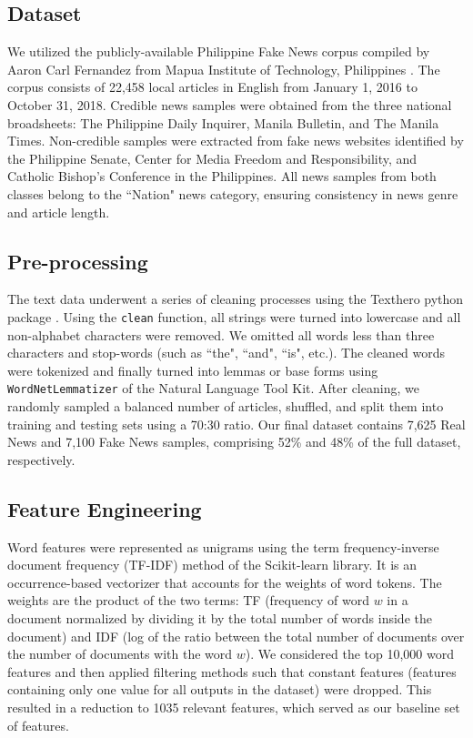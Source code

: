 \documentclass[10pt,a4paper,twoside]{article}
\begin{document}
\subsection{Dataset} 
We utilized the publicly-available Philippine Fake News corpus compiled by Aaron Carl Fernandez from Mapua Institute of Technology, Philippines \cite{Fernandez}. The corpus consists of 22,458 local articles in English from January 1, 2016 to October 31, 2018. Credible news samples were obtained from the three national broadsheets: The Philippine Daily Inquirer, Manila Bulletin, and The Manila Times. Non-credible samples were extracted from fake news websites identified by the Philippine Senate, Center for Media Freedom and Responsibility, and Catholic Bishop's Conference in the Philippines. All news samples from both classes belong to the ``Nation" news category, ensuring consistency in news genre and article length.
\vspace{-1.7em}
\subsection{Pre-processing} 
The text data underwent a series of cleaning processes using the Texthero python package \cite{Besomi_2023}. Using the {\color{gray}\texttt{clean}} function, all strings were turned into lowercase and all non-alphabet characters were removed. We omitted all words less than three characters and stop-words (such as ``the", ``and", ``is", etc.).  The cleaned words were tokenized and finally turned into lemmas or base forms using {\color{gray}\texttt{WordNetLemmatizer}}  of the Natural Language Tool Kit. After cleaning, we randomly sampled a balanced number of articles, shuffled, and split them into training and testing sets using a 70:30 ratio. Our final dataset contains 7,625 Real News and 7,100 Fake News samples, comprising 52\% and 48\% of the full dataset, respectively. 
\vspace{-0.5em}
\subsection{Feature Engineering} 
Word features were represented as unigrams using the term frequency-inverse document frequency (TF-IDF) method of the Scikit-learn library. It is an occurrence-based vectorizer that accounts for the weights of word tokens. The weights are the product of the two terms: TF (frequency of word $w$ in a document normalized by dividing it by the total number of words inside the document)  and IDF (log of the ratio between the total number of documents over the number of documents with the word $w$). We considered the top 10,000 word features and then applied filtering methods such that constant features (features containing only one value for all outputs in the dataset) were dropped. This resulted in a reduction to  1035 relevant features, which served as our baseline set of features.
\end{document}
